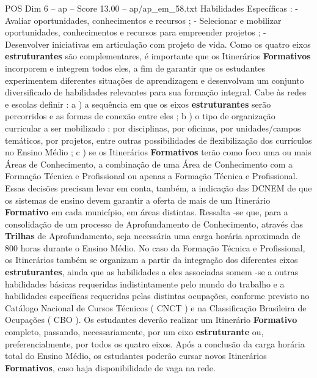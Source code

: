 \begin{textsample}{POS Dim 6 – ap – Score 13.00 – ap/ap\_em\_58.txt}
Habilidades Específicas : - Avaliar oportunidades, conhecimentos e recursos ; - Selecionar e mobilizar oportunidades, conhecimentos e recursos para empreender projetos ; - Desenvolver iniciativas em articulação com projeto de vida.
Como os quatro eixos \textbf{estruturantes} são complementares, é importante que os Itinerários \textbf{Formativos} incorporem e integrem todos eles, a fim de garantir que os estudantes experimentem diferentes situações de aprendizagem e desenvolvam um conjunto diversificado de habilidades relevantes para sua formação integral.
Cabe às redes e escolas definir : a ) a sequência em que os eixos \textbf{estruturantes} serão percorridos e as formas de conexão entre eles ; b ) o tipo de organização curricular a ser mobilizado : por disciplinas, por oficinas, por unidades/campos temáticos, por projetos, entre outras possibilidades de flexibilização dos currículos no Ensino Médio ; c ) se os Itinerários \textbf{Formativos} terão como foco uma ou mais Áreas de Conhecimento, a combinação de uma Área de Conhecimento com a Formação Técnica e Profissional ou apenas a Formação Técnica e Profissional.
Essas decisões precisam levar em conta, também, a indicação das DCNEM de que os sistemas de ensino devem garantir a oferta de mais de um Itinerário \textbf{Formativo} em cada município, em áreas distintas.
Ressalta -se que, para a consolidação de um processo de Aprofundamento de Conhecimento, através das \textbf{Trilhas} de Aprofundamento, seja necessária uma carga horária aproximada de 800 horas durante o Ensino Médio.
No caso da Formação Técnica e Profissional, os Itinerários também se organizam a partir da integração dos diferentes eixos \textbf{estruturantes}, ainda que as habilidades a eles associadas somem -se a outras habilidades básicas requeridas indistintamente pelo mundo do trabalho e a habilidades específicas requeridas pelas distintas ocupações, conforme previsto no Catálogo Nacional de Cursos Técnicos ( CNCT ) e na Classificação Brasileira de Ocupações ( CBO ).
Os estudantes deverão realizar um Itinerário \textbf{Formativo} completo, passando, necessariamente, por um eixo \textbf{estruturante} ou, preferencialmente, por todos os quatro eixos.
Após a conclusão da carga horária total do Ensino Médio, os estudantes poderão cursar novos Itinerários \textbf{Formativos}, caso haja disponibilidade de vaga na rede.

\end{textsample}
